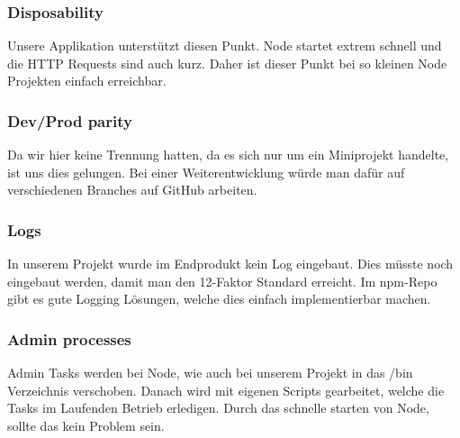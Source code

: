 \subsubsection{Disposability}
Unsere Applikation unterstützt diesen Punkt. Node startet extrem schnell und die HTTP Requests sind auch kurz. Daher ist dieser Punkt bei so kleinen Node Projekten einfach erreichbar.
\subsubsection{Dev/Prod parity}
Da wir hier keine Trennung hatten, da es sich nur um ein Miniprojekt handelte, ist uns dies gelungen. Bei einer Weiterentwicklung würde man dafür auf verschiedenen Branches auf GitHub arbeiten.
\subsubsection{Logs}
In unserem Projekt wurde im Endprodukt kein Log eingebaut. Dies müsste noch eingebaut werden, damit man den 12-Faktor Standard erreicht. Im npm-Repo gibt es gute Logging Lösungen, welche dies einfach implementierbar machen.
\subsubsection{Admin processes}
Admin Tasks werden bei Node, wie auch bei unserem Projekt in das /bin Verzeichnis verschoben. Danach wird mit eigenen Scripts gearbeitet, welche die Tasks im Laufenden Betrieb erledigen. Durch das schnelle starten von Node, sollte das kein Problem sein.










